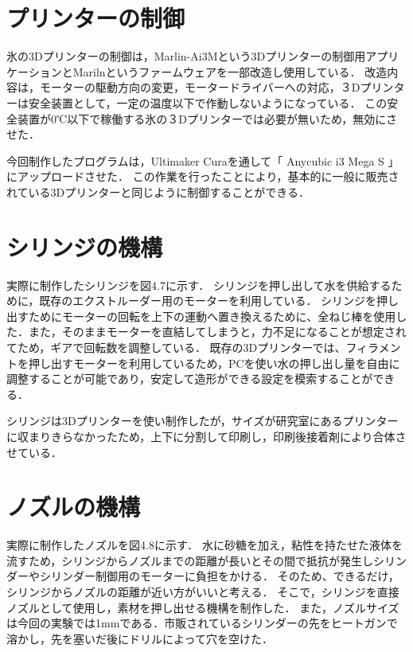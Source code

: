 \section{プリンターの制御}
\label{sec:paragraph}
氷の3Dプリンターの制御は，Marlin-Ai3Mという3Dプリンターの制御用アプリケーションとMarilnというファームウェアを一部改造し使用している．
改造内容は，モーターの駆動方向の変更，モータードライバーへの対応，３Dプリンターは安全装置として，一定の温度以下で作動しないようになっている．
この安全装置が0℃以下で稼働する氷の３Dプリンターでは必要が無いため，無効にさせた．

今回制作したプログラムは，Ultimaker Curaを通して「 Anycubic i3 Mega S 」にアップロードさせた．
この作業を行ったことにより，基本的に一般に販売されている3Dプリンターと同じように制御することができる．

\section{シリンジの機構}
\label{sec:paragraph}
実際に制作したシリンジを図4.7に示す．
シリンジを押し出して水を供給するために，既存のエクストルーダー用のモーターを利用している．
シリンジを押し出すためにモーターの回転を上下の運動へ置き換えるために、全ねじ棒を使用した．また，そのままモーターを直結してしまうと，力不足になることが想定されてため，ギアで回転数を調整している．
既存の3Dプリンターでは、フィラメントを押し出すモーターを利用しているため，PCを使い水の押し出し量を自由に調整することが可能であり，安定して造形ができる設定を模索することができる．

シリンジは3Dプリンターを使い制作したが，サイズが研究室にあるプリンターに収まりきらなかったため，上下に分割して印刷し，印刷後接着剤により合体させている．

\section{ノズルの機構}
\label{sec:paragraph}
実際に制作したノズルを図4.8に示す．
水に砂糖を加え，粘性を持たせた液体を流すため，シリンジからノズルまでの距離が長いとその間で抵抗が発生しシリンダーやシリンダー制御用のモーターに負担をかける．
そのため、できるだけ，シリンジからノズルの距離が近い方がいいと考える．
そこで，シリンジを直接ノズルとして使用し，素材を押し出せる機構を制作した．
また，ノズルサイズは今回の実験では1mmである．市販されているシリンダーの先をヒートガンで溶かし，先を塞いだ後にドリルによって穴を空けた．

